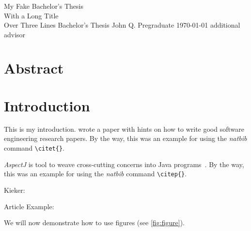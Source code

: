 

\hypersetup{pdftitle=My Fake Bachelor's Thesis with a Long Title over Three Lines}
\hypersetup{pdfauthor=John Q. Pregraduate}
\hypersetup{pdfsubject=Bachelor's Thesis }
\hypersetup{pdfkeywords=}


\frontmatter
  \thesistitlepage
    {My Fake Bachelor's Thesis \\[.1em]With a Long Title \\[.1em]Over Three Lines}%
    {Bachelor's Thesis}%
    {John Q. Pregraduate}%
    {\today}%
    {additional advisor} %

  \eidesstatt{}

  \chapter*{Abstract}
    \blindtext

  \tableofcontents{}

\mainmatter


\chapter{Introduction}
  This is my introduction.
  \citet{Shaw2003} wrote a paper with hints on how to write good software engineering research papers.
  By the way, this was an example for using the \textit{natbib} command \texttt{\textbackslash{}citet\{\}}.
  
  \textit{AspectJ} is tool to weave cross-cutting concerns into Java programs~\citep{AspectJ}. By the way, this was an example for using the \textit{natbib} command \texttt{\textbackslash{}citep\{\}}.
  
  Kieker: \citep{Rohr2008, Hoorn2009, Hoorn2012}
  
  Article Example: \citep{Frey2011}
  
  We will now demonstrate how to use figures (see \autoref{fig:figure}).
  
